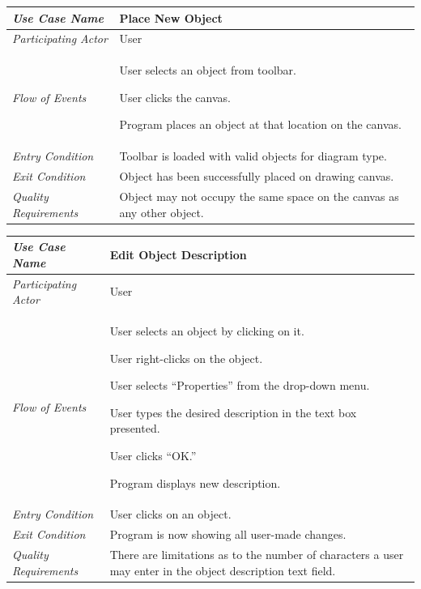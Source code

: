 \documentclass[twoside,letterpaper]{article}
\newenvironment{my_enumerate}{
\begin{enumerate}
  \setlength{\itemsep}{1pt}
  \setlength{\parskip}{0pt}
  \setlength{\parsep}{0pt}}{\end{enumerate}
}
\begin{document}
\begin{flushleft}
\tablehead{}
\begin{tabular}{|m{2.0in} m{5.0in}|}
\hline
{\bfseries\emph{Use Case Name}}
& {\bfseries Place New Object}
\\\hline
\emph{Participating Actor}
& User
\\\hline
\emph{Flow of Events}
& \begin{my_enumerate}
\item User selects an object from toolbar.
\item User clicks the canvas.
\item Program places an object at that location on the canvas.
\end{my_enumerate}
\\\hline
\emph{Entry Condition}
& Toolbar is loaded with valid objects for diagram type.
\\\hline
\emph{Exit Condition}
& Object has been successfully placed on drawing canvas.
\\\hline
\emph{Quality Requirements}
& Object may not occupy the same space on the canvas as any other object.
\\\hline
\end{tabular}
\end{flushleft}
\bigskip

\begin{flushleft}
\tablehead{}
\begin{tabular}{|m{2.0in} m{5.0in}|}
\hline
{\bfseries\emph{Use Case Name}}
& {\bfseries Edit Object Description}
\\\hline
\emph{Participating Actor}
& User
\\\hline
\emph{Flow of Events}
& \begin{my_enumerate}
\item User selects an object by clicking on it.
\item User right-clicks on the object.
\item User selects ``Properties'' from the drop-down menu.
\item User types the desired description in the text box presented.
\item User clicks ``OK.''
\item Program displays new description.
\end{my_enumerate}
\\\hline
\emph{Entry Condition}
& User clicks on an object.
\\\hline
\emph{Exit Condition}
& Program is now showing all user-made changes.
\\\hline
\emph{Quality Requirements}
& There are limitations as to the number of characters a user may enter in the object description text field.
\\\hline
\end{tabular}
\end{flushleft}
\bigskip
\end{document}

